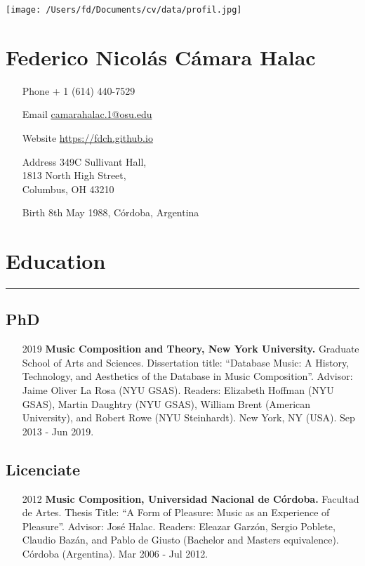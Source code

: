 \documentclass[12pt]{article}%
\begin{document}
%
\pagestyle{empty}%
\normalsize%
\pagestyle{empty}%
\raggedright%
\begin{minipage}{0.45\textwidth}%
\centering%
\texttt{[image: /Users/fd/Documents/cv/data/profil.jpg]}%
\end{minipage}%
\begin{minipage}{0.6\textwidth}%
\section{Federico Nicolás Cámara Halac}%
\label{sec:FedericoNicolsCmaraHalac}%
\begin{itemize}[align=parleft,leftmargin=2.25cm,labelwidth=2cm]
\item[Phone]
+ 1 (614) 440{-}7529
\item[Email]
\url{camarahalac.1@osu.edu}
\item[Website]
\url{https://fdch.github.io}
\item[Address]
349C Sullivant Hall,\\1813 North High Street,\\Columbus, OH 43210
\item[Birth]
8th May 1988, Córdoba, Argentina
\end{itemize}

%
\end{minipage}%
\hfill%
\section{Education}%
\label{sec:Education}%
\hrule%
\subsection{PhD}%
\begin{itemize}[align=parleft,leftmargin=2.25cm,labelwidth=2cm]
\item[2019]
\textbf{Music Composition and Theory, New York University.}
Graduate School of Arts and Sciences. 
Dissertation title: ``Database Music: A History, Technology, and Aesthetics of the Database in Music Composition''. Advisor: Jaime Oliver La Rosa (NYU GSAS). Readers: Elizabeth Hoffman (NYU GSAS), Martin Daughtry (NYU GSAS), William Brent (American University), and Robert Rowe (NYU Steinhardt). 
New York, NY (USA). 
Sep  2013 {-} Jun  2019.
\end{itemize}%
\subsection{Licenciate}%
\begin{itemize}[align=parleft,leftmargin=2.25cm,labelwidth=2cm]
\item[2012]
\textbf{Music Composition, Universidad Nacional de Córdoba.}
Facultad de Artes. 
Thesis Title: ``A Form of Pleasure: Music as an Experience of Pleasure''. Advisor: José Halac. Readers: Eleazar Garzón, Sergio Poblete, Claudio Bazán, and Pablo de Giusto (Bachelor and Masters equivalence). 
Córdoba (Argentina). 
Mar  2006 {-} Jul  2012.
\end{itemize}
\end{document}
